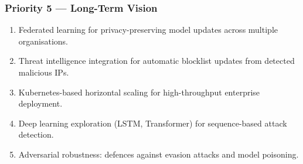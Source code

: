\documentclass[12pt,a4paper]{article}
\begin{document}
\subsubsection{Priority 5 — Long-Term Vision}

\begin{enumerate}
    \item Federated learning for privacy-preserving model updates across multiple organisations.
    \item Threat intelligence integration for automatic blocklist updates from detected malicious IPs.
    \item Kubernetes-based horizontal scaling for high-throughput enterprise deployment.
    \item Deep learning exploration (LSTM, Transformer) for sequence-based attack detection.
    \item Adversarial robustness: defences against evasion attacks and model poisoning.
\end{enumerate}
\end{document}
